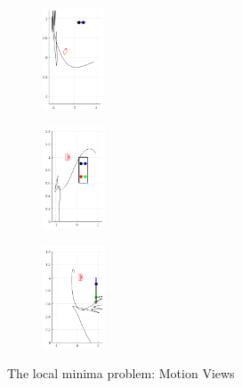 \documentclass[a4paper,12pt]{article}
\begin{document}
\begin{figure}[tb!]
         \begin{subfigure}[b]{0.32\textwidth}
                \centering
                \includegraphics[height=1.2in]{../results/demo5-XY.png}
                 \end{subfigure}
         \begin{subfigure}[b]{0.2\textwidth}
                \centering
                \includegraphics[height=1.2in]{../results/demo5-XZ.png}
                 \end{subfigure}%
         \begin{subfigure}[b]{0.32\textwidth}
                \centering
                \includegraphics[height=1.2in]{../results/demo5-YZ.png}
                 \end{subfigure}%
         \caption{The local minima problem: Motion Views} 
        \label{fig:vdemo5} 
\end{figure}
\end{document}
